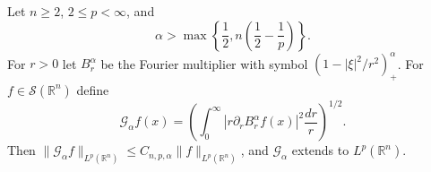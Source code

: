 Let $n\ge2$, $2\le p<\infty$, and
\[
\alpha>\max\left\{\frac12,n\left(\frac12-\frac1p\right)\right\}.
\]
For $r>0$ let $B_r^\alpha$ be the Fourier multiplier with symbol $(1-|\xi|^2/r^2)_+^\alpha$. For $f\in\mathcal S(\mathbb R^n)$ define
\[
\mathcal G_\alpha f(x)
 =\left(\int_0^\infty |r\partial_r B_r^\alpha f(x)|^2\frac{dr}{r}\right)^{1/2}.
\]
Then $\|\mathcal G_\alpha f\|_{L^p(\mathbb R^n)}\le C_{n,p,\alpha}\|f\|_{L^p(\mathbb R^n)}$, and $\mathcal G_\alpha$ extends to $L^p(\mathbb R^n)$.
